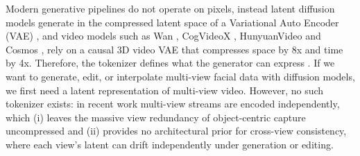 Modern generative pipelines do not operate on pixels, instead latent diffusion models generate in the compressed latent space of a Variational Auto Encoder (VAE) \cite{rombach2022high}, and video models such as Wan \cite{wan2025wan}, CogVideoX \cite{yang2024cogvideox}, HunyuanVideo \cite{kong2024hunyuanvideo} and Cosmos \cite{agarwal2025cosmos}, rely on a causal 3D video VAE that compresses space by 8x and time by 4x. Therefore, the tokenizer defines what the generator can express \cite{yu2024language}. If we want to generate, edit, or interpolate multi-view facial data with diffusion models, we first need a latent representation
of multi-view video. However, no such tokenizer exists: in recent work multi-view streams are encoded independently, which (i) leaves the massive view redundancy of object-centric capture uncompressed and (ii) provides no architectural prior for cross-view consistency, where each view's latent can drift independently under generation or editing.


